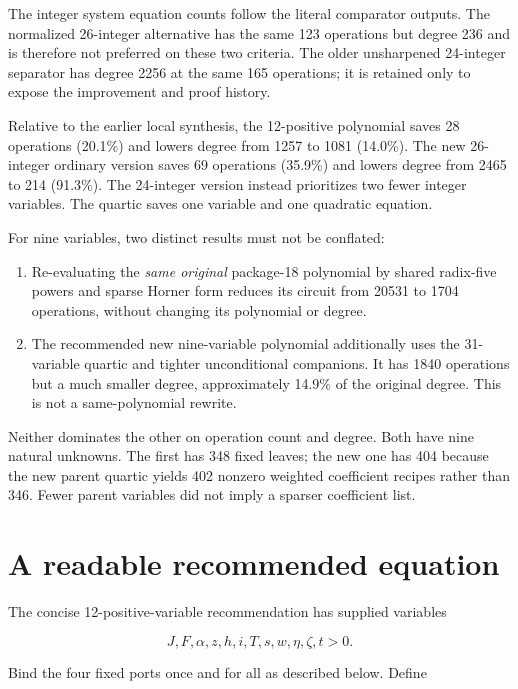 \documentclass[
  10pt,
]{article}
\providecommand{\tightlist}{%
  \setlength{\itemsep}{0pt}\setlength{\parskip}{0pt}}
\let\oldsection\section
\renewcommand{\section}{\clearpage\oldsection}
\begin{document}
The integer system equation counts follow the literal comparator
outputs. The normalized 26-integer alternative has the same 123
operations but degree 236 and is therefore not preferred on these two
criteria. The older unsharpened 24-integer separator has degree 2256 at
the same 165 operations; it is retained only to expose the improvement
and proof history.

Relative to the earlier local synthesis, the 12-positive polynomial
saves 28 operations (20.1\%) and lowers degree from 1257 to 1081
(14.0\%). The new 26-integer ordinary version saves 69 operations
(35.9\%) and lowers degree from 2465 to 214 (91.3\%). The 24-integer
version instead prioritizes two fewer integer variables. The quartic
saves one variable and one quadratic equation.

For nine variables, two distinct results must not be conflated:

\begin{enumerate}
\def\labelenumi{\arabic{enumi}.}
\tightlist
\item
  Re-evaluating the \emph{same original} package-18 polynomial by shared
  radix-five powers and sparse Horner form reduces its circuit from
  20531 to 1704 operations, without changing its polynomial or degree.
\item
  The recommended new nine-variable polynomial additionally uses the
  31-variable quartic and tighter unconditional companions. It has 1840
  operations but a much smaller degree, approximately 14.9\% of the
  original degree. This is not a same-polynomial rewrite.
\end{enumerate}

Neither dominates the other on operation count and degree. Both have
nine natural unknowns. The first has 348 fixed leaves; the new one has
404 because the new parent quartic yields 402 nonzero weighted
coefficient recipes rather than 346. Fewer parent variables did not
imply a sparser coefficient list.

\section{A readable recommended
equation}\label{a-readable-recommended-equation}

The concise 12-positive-variable recommendation has supplied variables

\[J, F,\alpha, z, h, i, T, s, w,\eta,\zeta, t>0.\]

Bind the four fixed ports once and for all as described below. Define
\end{document}

